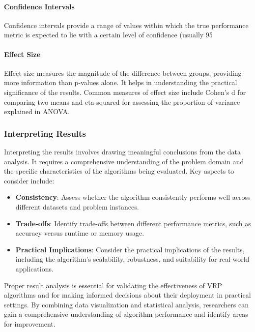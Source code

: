 \documentclass[
]{article}
\begin{document}
    \paragraph{Confidence Intervals}

    Confidence intervals provide a range of values within which the true performance metric is expected to lie with a certain level of confidence (usually 95%

    \paragraph{Effect Size}

    Effect size measures the magnitude of the difference between groups, providing more information than p-values alone. It helps in understanding the practical significance of the results. Common measures of effect size include Cohen's d for comparing two means and eta-squared for assessing the proportion of variance explained in ANOVA.

    \subsubsection{Interpreting Results}

    Interpreting the results involves drawing meaningful conclusions from the data analysis. It requires a comprehensive understanding of the problem domain and the specific characteristics of the algorithms being evaluated. Key aspects to consider include:

    \begin{itemize}
        \item \textbf{Consistency}: Assess whether the algorithm consistently performs well across different datasets and problem instances.
        \item \textbf{Trade-offs}: Identify trade-offs between different performance metrics, such as accuracy versus runtime or memory usage.
        \item \textbf{Practical Implications}: Consider the practical implications of the results, including the algorithm's scalability, robustness, and suitability for real-world applications.
    \end{itemize}

    Proper result analysis is essential for validating the effectiveness of VRP algorithms and for making informed decisions about their deployment in practical settings. By combining data visualization and statistical analysis, researchers can gain a comprehensive understanding of algorithm performance and identify areas for improvement.
\end{document}
